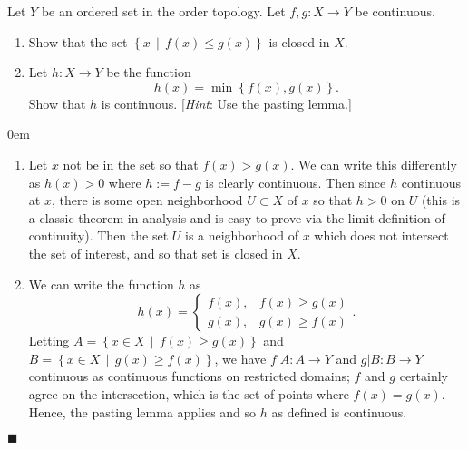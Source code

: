 \documentclass[12pt]{article}
\renewcommand{\qed}{\hfill$\blacksquare$}
\renewenvironment{proof}{\begin{addmargin}[1em]{0em}\begin{newproof}}{\end{newproof}\end{addmargin}\qed}
\newenvironment{problem}[2][Exercise]{\begin{trivlist}
\item[\hskip \labelsep {\bfseries #1}\hskip \labelsep {\bfseries #2.}]}{\end{trivlist}}
\begin{document}
\begin{problem}{18.8}
	Let $Y$ be an ordered set in the order topology. Let $f,g:X\rightarrow Y$ be continuous.
	\begin{enumerate}[label=(\alph*)]
		\item Show that the set $\left\{ x\, \middle| \, f\left(x\right)\leq g\left(x\right)\right\}$ is closed in $X$.
		\item Let $h:X\rightarrow Y$ be the function $$ h\left(x\right) = \min \left\{f\left(x\right),g\left(x\right) \right\}.$$ Show that $h$ is continuous. [\textit{Hint}: Use the pasting lemma.]
	\end{enumerate}
\end{problem}
\begin{proof}
		\begin{enumerate}[label=(\alph*)]
			\item Let $x$ not be in the set so that $f\left(x\right) > g\left(x\right)$. We can write this differently as $h\left(x\right)>0$ where $h:=f-g$ is clearly continuous. Then since $h$ continuous at $x$, there is some open neighborhood $U\subset X$ of $x$ so that $h>0$ on $U$ (this is a classic theorem in analysis and is easy to prove via the limit definition of continuity). Then the set $U$ is a neighborhood of $x$ which does not intersect the set of interest, and so that set is closed in $X$.
			\item We can write the function $h$ as $$ h\left(x\right) = \left\{ \begin{array}{rl} f\left(x\right), & f\left(x\right) \geq g\left(x\right) \\ g\left(x\right), & g\left(x\right) \geq f\left(x\right) \end{array}\right. .$$ Letting $A=\left\{ x \in X \, \middle| \, f\left(x\right) \geq g\left(x\right)\right\}$ and $B=\left\{ x \in X \, \middle| \, g\left(x\right) \geq f\left(x\right)\right\}$, we have $f|A:A\rightarrow Y$ and $g|B:B\rightarrow Y$ continuous as continuous functions on restricted domains; $f$ and $g$ certainly agree on the intersection, which is the set of points where $f\left(x\right) = g\left(x\right)$. Hence, the pasting lemma applies and so $h$ as defined is continuous.
		\end{enumerate}
\end{proof}
\end{document}
